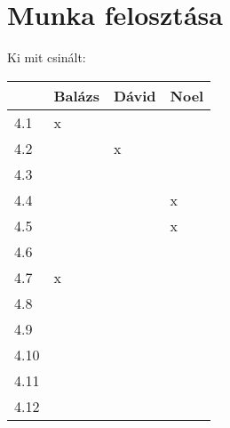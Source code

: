 \section{Munka felosztása}\label{sec:munka-felosztasa}

Ki mit csinált:


\begin{tabular}{ |p{3cm}|p{3cm}|p{3cm}|p{3cm}|  }
    \hline
    &Balázs & Dávid & Noel \\
    \hline
    4.1&x&& \\
    \hline
    4.2&&x& \\
    \hline
    4.3&&& \\
    \hline
    4.4&&&x \\
    \hline
    4.5&&&x \\
    \hline
    4.6&&& \\
    \hline
    4.7&x&& \\
    \hline
    4.8&&& \\
    \hline
    4.9&&& \\
    \hline
    4.10&&& \\
    \hline
    4.11&&& \\
    \hline
    4.12&&& \\
    \hline
\end{tabular}